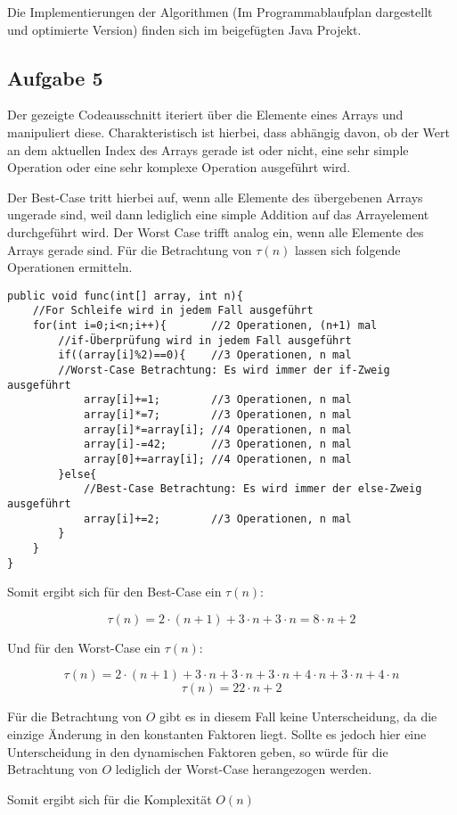 \documentclass[a4paper,
			   fontsize=12pt]{article}
\begin{document}
Die Implementierungen der Algorithmen (Im Programmablaufplan dargestellt und optimierte Version) finden sich im beigefügten Java Projekt.

\vspace{0,75cm}
\subsection*{Aufgabe 5}

Der gezeigte Codeausschnitt iteriert über die Elemente eines Arrays und manipuliert diese. Charakteristisch ist hierbei, dass abhängig davon, ob der Wert an dem aktuellen Index des Arrays gerade
ist oder nicht, eine sehr simple Operation oder eine sehr komplexe Operation ausgeführt wird.

Der Best-Case tritt hierbei auf, wenn alle Elemente des übergebenen Arrays ungerade sind, weil dann lediglich eine simple Addition auf das Arrayelement durchgeführt wird. Der Worst Case trifft analog ein,
wenn alle Elemente des Arrays gerade sind. Für die Betrachtung von $\tau(n)$ lassen sich folgende Operationen ermitteln.

\begin{lstlisting}
public void func(int[] array, int n){
	//For Schleife wird in jedem Fall ausgeführt
    for(int i=0;i<n;i++){		//2 Operationen, (n+1) mal
        //if-Überprüfung wird in jedem Fall ausgeführt
		if((array[i]%2)==0){	//3 Operationen, n mal
		//Worst-Case Betrachtung: Es wird immer der if-Zweig ausgeführt
            array[i]+=1;		//3 Operationen, n mal
            array[i]*=7;		//3 Operationen, n mal
            array[i]*=array[i];	//4 Operationen, n mal
            array[i]-=42;		//3 Operationen, n mal
            array[0]+=array[i];	//4 Operationen, n mal
        }else{
			//Best-Case Betrachtung: Es wird immer der else-Zweig ausgeführt
            array[i]+=2;		//3 Operationen, n mal
        }
    }
}
\end{lstlisting}

Somit ergibt sich für den Best-Case ein $\tau(n)$:

$$\tau(n)=2\cdot (n+1) + 3\cdot n + 3\cdot n = 8\cdot n+2$$

Und für den Worst-Case ein $\tau(n)$:

$$\tau(n)=2\cdot (n+1) + 3\cdot n +3\cdot n +3\cdot n +4\cdot n +3\cdot n +4\cdot n $$
$$\tau(n)=22\cdot n + 2$$

Für die Betrachtung von $O$ gibt es in diesem Fall keine Unterscheidung, da die einzige Änderung in den konstanten Faktoren liegt. Sollte es jedoch hier eine Unterscheidung
in den dynamischen Faktoren geben, so würde für die Betrachtung von $O$ lediglich der Worst-Case herangezogen werden. 

Somit ergibt sich für die Komplexität $O(n)$
\end{document}
